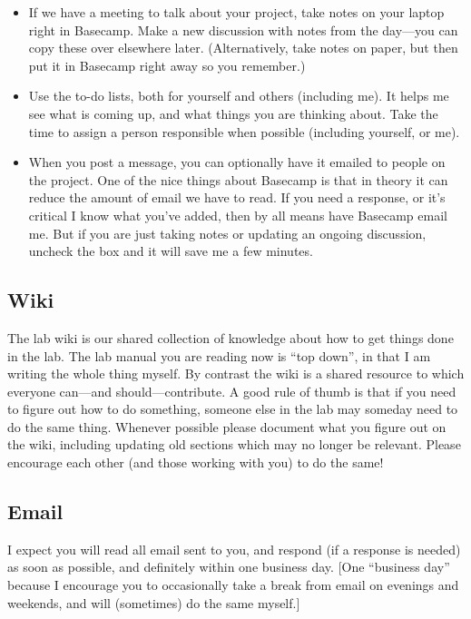 \documentclass[letterpaper,12pt,oneside]{memoir}
\begin{document}
\begin{itemize}
\item If we have a meeting to talk about your project, take notes on your laptop right in Basecamp. Make a new discussion with notes from the day---you can copy these over elsewhere later. (Alternatively, take notes on paper, but then put it in Basecamp right away so you remember.)

\item Use the to-do lists, both for yourself and others (including me). It helps me see what is coming up, and what things you are thinking about. Take the time to assign a person responsible when possible (including yourself, or me).

\item When you post a message, you can optionally have it emailed to people on the project. One of the nice things about Basecamp is that in theory it can reduce the amount of email we have to read. If you need a response, or it's critical I know what you've added, then by all means have Basecamp email me. But if you are just taking notes or updating an ongoing discussion, uncheck the box and it will save me a few minutes.
\end{itemize}

\subsection{Wiki}

The lab wiki is our shared collection of knowledge about how to get things done in the lab. The lab manual you are reading now is ``top down'', in that I am writing the whole thing myself. By contrast the wiki is a shared resource to which everyone can---and should---contribute. A good rule of thumb is that if you need to figure out how to do something, someone else in the lab may someday need to do the same thing. Whenever possible please document what you figure out on the wiki, including updating old sections which may no longer be relevant. Please encourage each other (and those working with you) to do the same!


\subsection{Email}
I expect you will read all email sent to you, and respond (if a response is needed) as soon as possible, and definitely within one business day. [One ``business day'' because I encourage you to occasionally take a break from email on evenings and weekends, and will (sometimes) do the same myself.]
\end{document}
